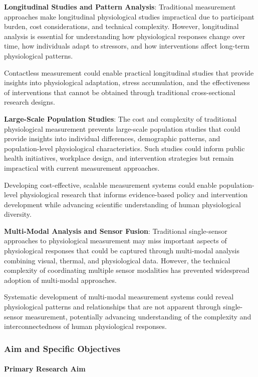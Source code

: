 \documentclass[12pt,a4paper]{report}
\begin{document}
\textbf{Longitudinal Studies and Pattern Analysis}: Traditional measurement approaches make longitudinal physiological
studies impractical due to participant burden, cost considerations, and technical complexity. However, longitudinal
analysis is essential for understanding how physiological responses change over time, how individuals adapt to
stressors, and how interventions affect long-term physiological patterns.

Contactless measurement could enable practical longitudinal studies that provide insights into physiological adaptation,
stress accumulation, and the effectiveness of interventions that cannot be obtained through traditional cross-sectional
research designs.

\textbf{Large-Scale Population Studies}: The cost and complexity of traditional physiological measurement prevents
large-scale population studies that could provide insights into individual differences, demographic patterns, and
population-level physiological characteristics. Such studies could inform public health initiatives, workplace design,
and intervention strategies but remain impractical with current measurement approaches.

Developing cost-effective, scalable measurement systems could enable population-level physiological research that
informs evidence-based policy and intervention development while advancing scientific understanding of human
physiological diversity.

\textbf{Multi-Modal Analysis and Sensor Fusion}: Traditional single-sensor approaches to physiological measurement may miss
important aspects of physiological responses that could be captured through multi-modal analysis combining visual,
thermal, and physiological data. However, the technical complexity of coordinating multiple sensor modalities has
prevented widespread adoption of multi-modal approaches.

Systematic development of multi-modal measurement systems could reveal physiological patterns and relationships that are
not apparent through single-sensor measurement, potentially advancing understanding of the complexity and
interconnectedness of human physiological responses.

\subsubsection{Aim and Specific Objectives}

\paragraph{Primary Research Aim}
\end{document}
